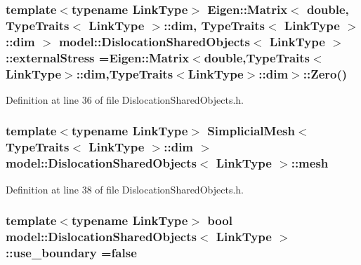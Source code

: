 \subsubsection[{external\+Stress}]{\setlength{\rightskip}{0pt plus 5cm}template$<$typename Link\+Type$>$ Eigen\+::\+Matrix$<$ double, {\bf Type\+Traits}$<$ {\bf Link\+Type} $>$\+::{\bf dim}, {\bf Type\+Traits}$<$ {\bf Link\+Type} $>$\+::{\bf dim} $>$ {\bf model\+::\+Dislocation\+Shared\+Objects}$<$ {\bf Link\+Type} $>$\+::external\+Stress =Eigen\+::\+Matrix$<$double,{\bf Type\+Traits}$<${\bf Link\+Type}$>$\+::{\bf dim},{\bf Type\+Traits}$<${\bf Link\+Type}$>$\+::{\bf dim}$>$\+::Zero()\hspace{0.3cm}{\ttfamily [static]}}\label{structmodel_1_1_dislocation_shared_objects_ab38af6b9f62b37c9741434c42582cf7d}


Definition at line 36 of file Dislocation\+Shared\+Objects.\+h.

\hypertarget{structmodel_1_1_dislocation_shared_objects_a53f7edc298b9b57ec1eef2c3b900c8bf}{}
\subsubsection[{mesh}]{\setlength{\rightskip}{0pt plus 5cm}template$<$typename Link\+Type$>$ {\bf Simplicial\+Mesh}$<$ {\bf Type\+Traits}$<$ {\bf Link\+Type} $>$\+::{\bf dim} $>$ {\bf model\+::\+Dislocation\+Shared\+Objects}$<$ {\bf Link\+Type} $>$\+::mesh\hspace{0.3cm}{\ttfamily [static]}}\label{structmodel_1_1_dislocation_shared_objects_a53f7edc298b9b57ec1eef2c3b900c8bf}


Definition at line 38 of file Dislocation\+Shared\+Objects.\+h.

\hypertarget{structmodel_1_1_dislocation_shared_objects_ac36d30f3f49291da4b0495cea97bf1b6}{}
\subsubsection[{use\+\_\+boundary}]{\setlength{\rightskip}{0pt plus 5cm}template$<$typename Link\+Type$>$ bool {\bf model\+::\+Dislocation\+Shared\+Objects}$<$ {\bf Link\+Type} $>$\+::use\+\_\+boundary =false\hspace{0.3cm}{\ttfamily [static]}}\label{structmodel_1_1_dislocation_shared_objects_ac36d30f3f49291da4b0495cea97bf1b6}


